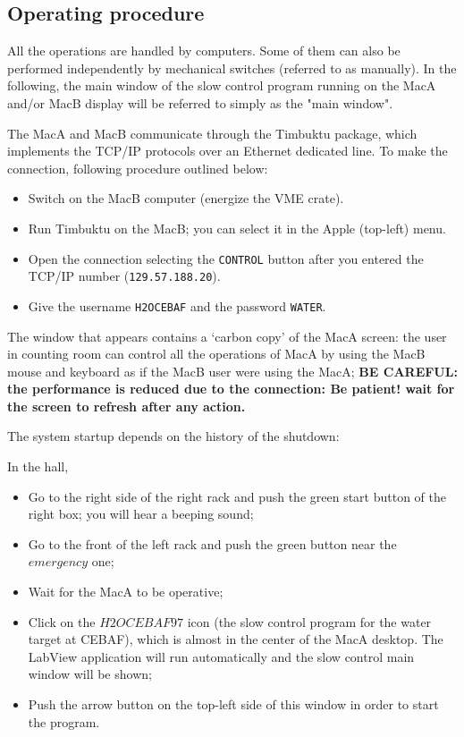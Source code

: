 \subsection{Operating procedure} \label{op_proc}

All the operations are handled by computers. Some of them can also be 
performed independently by mechanical switches (referred to as
manually). In the 
following, the main window of the slow control program running on 
the MacA and/or MacB display will be referred to simply as
the "main window". \\


The MacA and MacB communicate through the Timbuktu package, which 
implements the TCP/IP protocols over an Ethernet dedicated line.
To make the connection, following procedure outlined below:

\begin{itemize}
\item Switch on the MacB computer (energize the VME crate).
\item Run Timbuktu on the MacB; you can select it in the Apple (top-left) 
	menu.
\item Open the connection selecting the \verb=CONTROL= button after you 
	entered the TCP/IP number (\verb:129.57.188.20:).
\item Give the username \verb=H2OCEBAF= and the password 
	\verb=WATER=.
\end{itemize}

The window that appears contains a `carbon copy' of the MacA screen:
the user in counting room can control all the operations of MacA by
 using the MacB mouse and keyboard as if the MacB user were using the
 MacA; {\bf BE CAREFUL: the performance is reduced due to the 
connection: Be patient! wait for the screen to refresh after any 
action.} \\


The system startup depends on the history of the shutdown: \\


In the hall,
\begin{itemize}
 \item Go to the right side of the right rack and push the green start 
   button
   of the right box; you will hear a beeping sound;
 \item Go to the front of the left rack and push the green button near the
   $emergency$ one;
 \item Wait for the MacA to be operative;
 \item Click on the $H2O CEBAF97$ icon (the slow control program for the
   water target at CEBAF), which is almost in the center of the
   MacA desktop. The LabView application will run automatically
  and the slow control main window will be shown;
\item Push the arrow button on the top-left side of this window in order to 
  start the program.
\end{itemize}

